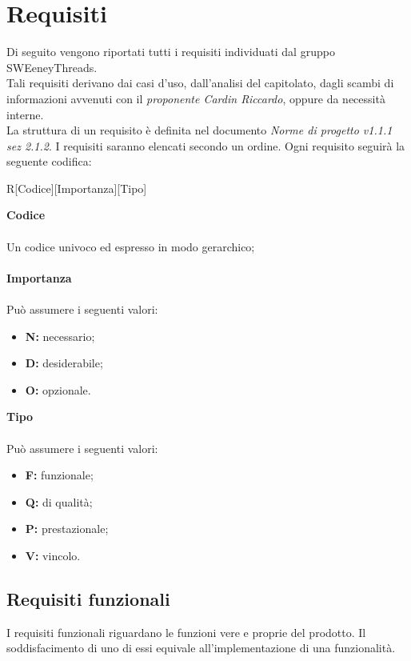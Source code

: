 \documentclass[a4paper]{article}
\begin{document}
		 
	 
	\newpage \section{Requisiti}
		Di seguito vengono riportati tutti i requisiti individuati dal gruppo SWEeneyThreads. \\Tali requisiti
		derivano dai casi d'uso, dall'analisi del capitolato, dagli scambi di informazioni avvenuti con il
		\emph{proponente Cardin Riccardo}, oppure da necessità interne. \\
		La struttura di un requisito è definita nel documento \emph{Norme di progetto v1.1.1 sez 2.1.2}.
		I requisiti saranno elencati secondo un ordine. Ogni requisito seguirà la seguente codifica: \\
		\begin{center}
			R[Codice][Importanza][Tipo]
		\end{center}
		\textbf{Codice} \\ \\ Un codice univoco ed espresso in modo gerarchico;\\ \\
		\textbf{Importanza} \\ \\Può assumere i seguenti valori:
		\begin{itemize}
			\item \textbf{N:} necessario;
			\item \textbf{D:} desiderabile;
			\item \textbf{O:} opzionale.
		\end{itemize}
		\textbf{Tipo} \\ \\Può assumere i seguenti valori:
		\begin{itemize}
			\item \textbf{F:} funzionale;
			\item \textbf{Q:} di qualità;
			\item \textbf{P:} prestazionale;
			\item \textbf{V:} vincolo.
		\end{itemize}
	
	\subsection{Requisiti funzionali}
	I requisiti funzionali riguardano le funzioni vere e proprie del prodotto. Il soddisfacimento di uno di essi
	equivale all'implementazione di una funzionalità.
\end{document}
